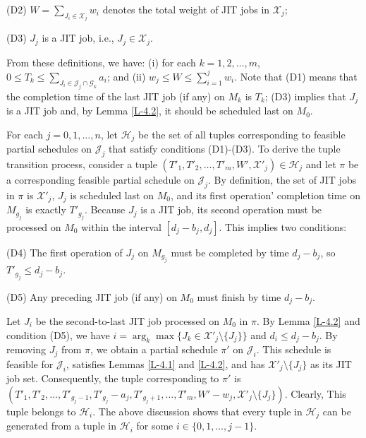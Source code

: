 \documentclass[12pt, eqno, limlimits]{article}
\begin{document}
\begin{sloppypar}
\begin{description}
            \item (D2) $W=\sum_{J_i \in \mathcal{X}_j} w_i$ denotes the total weight of JIT jobs in $\mathcal{X}_j$;
            
            \item (D3) $J_j$ is a JIT job, i.e., $J_j \in \mathcal{X}_j$.
        \end{description}
        From these definitions, we have: (i) for each $k=1, 2, \ldots, m$, $0 \leq T_k \leq \sum_{J_i \in \mathcal{J}_j \cap \mathcal{G}_k} a_i$; and (ii) $w_j \leq W \leq \sum_{i=1}^j w_i$. Note that (D1) means that the completion time of the last JIT job (if any) on $M_k$ is $T_k$; (D3) implies that $J_j$ is a JIT job and, by Lemma \ref{L-4.2}, it should be scheduled last on $M_0$. 
        
        For each $j=0, 1, \ldots, n$, let $\mathcal{H}_j$ be the set of all tuples corresponding to feasible partial schedules on $\mathcal{J}_j$ that satisfy conditions (D1)-(D3). To derive the tuple transition process, consider a tuple $(T'_1, T'_2, \ldots, T'_m, W', \mathcal{X}'_j) \in \mathcal{H}_j$ and let $\pi$ be a corresponding feasible partial schedule on $\mathcal{J}_j$. By definition, the set of JIT jobs in $\pi$ is $\mathcal{X}'_j$, $J_j$ is scheduled last on $M_0$, and its first operation' completion time on $M_{g_j}$ is exactly $T'_{g_j}$. Because $J_j$ is a JIT job, its second operation must be processed on $M_0$ within the interval $[d_j-b_j, d_j]$. This implies two conditions:  
        \begin{description}
            \item (D4) The first operation of $J_j$ on $M_{g_j}$ must be completed by time $d_j-b_j$, so $T'_{g_j} \leq d_j-b_j$.
            
            \item (D5) Any preceding JIT job (if any) on $M_0$ must finish by time $d_j-b_j$.
        \end{description}
        Let $J_i$ be the second-to-last JIT job processed on $M_0$ in $\pi$. By Lemma \ref{L-4.2} and condition (D5), we have $i=\arg_k \max\{J_k \in \mathcal{X}'_j \setminus \{J_j\}\}$ and $d_i \leq d_j-b_j$. By removing $J_j$ from $\pi$, we obtain a partial schedule $\pi'$ on $\mathcal{J}_i$. This schedule is feasible for $\mathcal{J}_i$, satisfies Lemmas \ref{L-4.1} and \ref{L-4.2}, and has $\mathcal{X}'_j \setminus \{J_j\}$ as its JIT job set. Consequently, the tuple corresponding to $\pi'$ is $(T'_1, T'_2, \ldots, T'_{g_j-1}, T'_{g_j}-a_j, T'_{g_j+1}, \ldots, T'_m, W'-w_j, \mathcal{X}'_j \setminus \{J_j\})$. Clearly, This tuple belongs to $\mathcal{H}_i$. The above discussion shows that every tuple in $\mathcal{H}_j$ can be generated from a tuple in $\mathcal{H}_i$ for some $i \in \{0, 1,  \ldots, j-1\}$.
        

\end{sloppypar}
\end{document}
